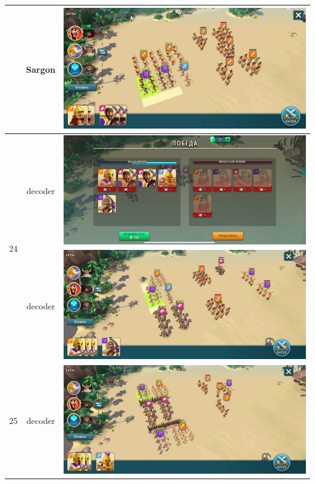 \begin{longtable}{|c|c|c|}
    & Sargon &
    \includegraphics[width=0.75\linewidth]{./parts/media/TreasureHunt/23/sargon/photo_2022-04-06_18-12-18.jpg} \\
    \hline
    \multirow{2}{*}{24} & decoder &
    \includegraphics[width=0.75\linewidth]{./parts/media/TreasureHunt/24/decoder/photo_2022-04-06_18-10-13.jpg} \\
    & decoder &
    \includegraphics[width=0.75\linewidth]{./parts/media/TreasureHunt/24/decoder/photo_2022-04-06_18-10-02.jpg} \\
    \hline
    \multirow{10}{*}{25} & decoder &
    \includegraphics[width=0.75\linewidth]{./parts/media/TreasureHunt/25/decoder/photo_2022-04-06_18-10-20.jpg} \\

\end{longtable}
